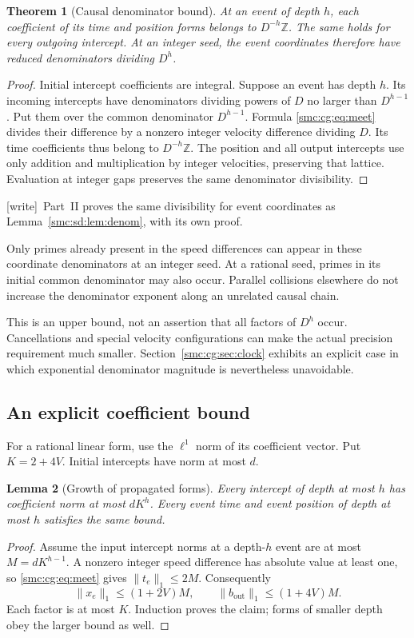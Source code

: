 \documentclass[11pt,letterpaper]{article}
\numberwithin{equation}{section}
\newtheorem{theorem}{Theorem}[section]
\newtheorem{lemma}[theorem]{Lemma}
\theoremstyle{definition}
\theoremstyle{remark}
\newcommand{\Z}{\mathbb Z}
\newcommand{\wtag}{\textup{[write]}}
\begin{document}
\begin{theorem}[Causal denominator bound]
\label{smc:cg:thm:denominator}
At an event of depth $h$, each coefficient of its time and position forms
belongs to $D^{-h}\Z$. The same holds for every outgoing intercept. At an
integer seed, the event coordinates therefore have reduced denominators
dividing $D^h$.
\end{theorem}
\begin{proof}
Initial intercept coefficients are integral. Suppose an event has depth $h$.
Its incoming intercepts have denominators dividing powers of $D$ no larger
than $D^{h-1}$. Put them over the common denominator $D^{h-1}$. Formula
\eqref{smc:cg:eq:meet} divides their difference by a nonzero integer velocity
difference dividing $D$. Its time coefficients thus belong to $D^{-h}\Z$.
The position and all output intercepts use only addition and multiplication
by integer velocities, preserving that lattice. Evaluation at integer gaps
preserves the same denominator divisibility.
\end{proof}

\wtag\ Part~II proves the same divisibility for event coordinates as Lemma~\ref{smc:sd:lem:denom}, with its own proof.

Only primes already present in the speed differences can appear in these
coordinate denominators at an integer seed. At a rational seed, primes in
its initial common denominator may also occur. Parallel collisions elsewhere
do not increase the denominator exponent along an unrelated causal chain.

This is an upper bound, not an assertion that all factors of $D^h$ occur.
Cancellations and special velocity configurations can make the actual
precision requirement much smaller. Section~\ref{smc:cg:sec:clock} exhibits an
explicit case in which exponential denominator magnitude is nevertheless
unavoidable.

\subsection{An explicit coefficient bound}

For a rational linear form, use the $\ell^1$ norm of its coefficient vector.
Put $K=2+4V$. Initial intercepts have norm at most $d$.

\begin{lemma}[Growth of propagated forms]
\label{smc:cg:lem:norm}
Every intercept of depth at most $h$ has coefficient norm at most $dK^h$.
Every event time and event position of depth at most $h$ satisfies the same
bound.
\end{lemma}
\begin{proof}
Assume the input intercept norms at a depth-$h$ event are at most
$M=dK^{h-1}$. A nonzero integer speed difference has absolute value at least
one, so \eqref{smc:cg:eq:meet} gives $\|t_e\|_1\le2M$. Consequently
\[
 \|x_e\|_1\le(1+2V)M,\qquad
 \|b_{\mathrm{out}}\|_1\le(1+4V)M.
\]
Each factor is at most $K$. Induction proves the claim; forms of smaller
depth obey the larger bound as well.
\end{proof}
\end{document}

